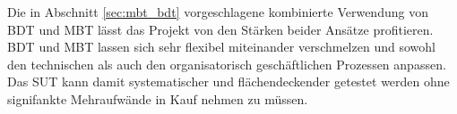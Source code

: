 Die in Abschnitt \ref{sec:mbt_bdt} vorgeschlagene kombinierte Verwendung von \Gls{BDT}  und \Gls{MBT} lässt das Projekt von den Stärken beider Ansätze profitieren. \Gls{BDT} und \Gls{MBT} lassen sich sehr flexibel miteinander verschmelzen und sowohl den technischen als auch den organisatorisch geschäftlichen Prozessen anpassen. Das \Gls{SUT} kann damit systematischer und flächendeckender getestet werden ohne signifankte Mehraufwände in Kauf nehmen zu müssen.











